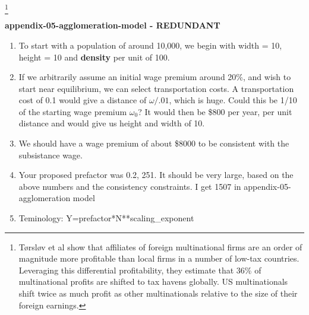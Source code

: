 \begin{enumerate}
\begin{quotation}
\end{quotation}

\end{enumerate}



\footnote{Tørsløv et al \cite{torslovMissingProfitsNations2023} show that affiliates of foreign multinational firms are an order of magnitude more profitable than local firms in a number of low-tax countries. Leveraging this differential profitability, they estimate that 36\% of multinational profits are shifted to tax havens globally. US multinationals shift twice as much profit as other multinationals relative to the size of their foreign earnings.}


\textbf{appendix-05-agglomeration-model - REDUNDANT} %



\begin{enumerate}
\item To start with a population of around 10,000, we begin with width = 10, height = 10 and \textbf{density} per unit of 100. 

\item If we arbitrarily assume an initial wage premium around 20\%, and wish to start near equilibrium, %
we can select transportation costs. A transportation cost of 0.1  would give a distance of $\omega/.01$, which is huge. Could this be 1/10 of the starting wage premium $\omega_0$? It would then be \$800 per year, per unit distance and would give us height and width of 10. 
\item We should have a wage premium of about \$8000 to be consistent with the subsistance wage. %

\item Your proposed prefactor was 0.2,  251. It should be very large, based on the above numbers and the consistency constraints. I get 1507 in appendix-05-agglomeration model

\item Teminology: Y=prefactor*N**scaling\_exponent

\end{enumerate}

